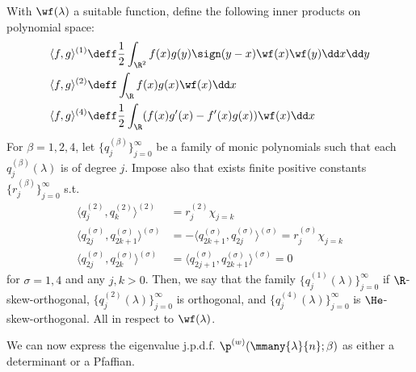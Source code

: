 \begin{definition}
	With $\wf(\lambda)$ a suitable function, define the following inner products on polynomial space:
	\begin{align}
		\langle f,g \rangle^{(1)} & \deff \frac{1}{2} \int_{\R^2} f(x) g(y) \sign(y-x) \wf(x) \wf(y) \dd x \dd y \\
		\langle f,g \rangle^{(2)} & \deff \int_{\R} f(x) g(x) \wf(x) \dd x \\
		\langle f,g \rangle^{(4)} & \deff \frac{1}{2} \int_{\R} (f(x)g'(x) - f'(x)g(x)) \wf(x) \dd x
	\end{align}
	For $\beta = 1,2,4$, let $\{q_j^{(\beta)}\}_{j=0}^\infty$ be a family of monic polynomials such that each $q_j^{(\beta)}(\lambda)$ is of degree $j$. Impose also that exists finite positive constants $\{r_j^{(\beta)}\}_{j=0}^\infty$ s.t.
	\begin{align}
		\langle q_j^{(2)}, q_k^{(2)} \rangle^{(2)} & = r_j^{(2)} \chi_{j=k} \\
		\langle q^{(\sigma)}_{2j}, q^{(\sigma)}_{2k+1} \rangle^{(\sigma)} & = - \langle q^{(\sigma)}_{2k+1}, q^{(\sigma)}_{2j} \rangle^{(\sigma)} = r_j^{(\sigma)} \chi_{j=k} \\
		\langle q^{(\sigma)}_{2j}, q^{(\sigma)}_{2k} \rangle^{(\sigma)} & = \langle q^{(\sigma)}_{2j+1}, q^{(\sigma)}_{2k+1} \rangle^{(\sigma)} = 0
	\end{align}	
	for $\sigma = 1, 4$ and any $j,k>0$. Then, we say that the family $\{q_j^{(1)}(\lambda)\}_{j=0}^\infty$ if $\R$-skew-orthogonal, $\{q_j^{(2)}(\lambda)\}_{j=0}^\infty$ is orthogonal, and $\{q_j^{(4)}(\lambda)\}_{j=0}^\infty$ is $\He$-skew-orthogonal. All in respect to $\wf(\lambda)$.
\end{definition}

We can now express the eigenvalue j.p.d.f. $\p^{(w)}(\mmany{\lambda}{n};\beta)$ as either a determinant or a Pfaffian. 

